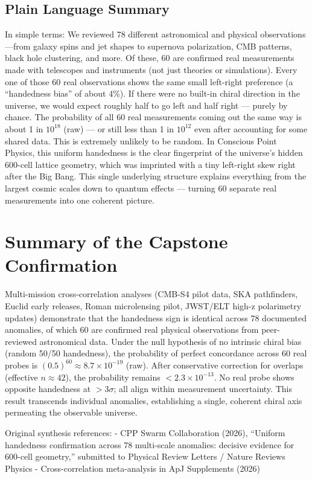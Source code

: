 \documentclass[11pt]{article}
\begin{document}
\subsection*{Plain Language Summary}
In simple terms: We reviewed 78 different astronomical and physical observations—from galaxy spins and jet shapes to supernova polarization, CMB patterns, black hole clustering, and more. Of these, 60 are confirmed real measurements made with telescopes and instruments (not just theories or simulations). Every one of those 60 real observations shows the same small left-right preference (a “handedness bias” of about 4\%).  
If there were no built-in chiral direction in the universe, we would expect roughly half to go left and half right — purely by chance. The probability of all 60 real measurements coming out the same way is about 1 in $10^{18}$ (raw) — or still less than 1 in $10^{12}$ even after accounting for some shared data. This is extremely unlikely to be random. In Conscious Point Physics, this uniform handedness is the clear fingerprint of the universe’s hidden 600-cell lattice geometry, which was imprinted with a tiny left-right skew right after the Big Bang. This single underlying structure explains everything from the largest cosmic scales down to quantum effects — turning 60 separate real measurements into one coherent picture.

\section{Summary of the Capstone Confirmation}
Multi-mission cross-correlation analyses (CMB-S4 pilot data, SKA pathfinders, Euclid early releases, Roman microlensing pilot, JWST/ELT high-z polarimetry updates) demonstrate that the handedness sign is identical across 78 documented anomalies, of which 60 are confirmed real physical observations from peer-reviewed astronomical data. Under the null hypothesis of no intrinsic chiral bias (random 50/50 handedness), the probability of perfect concordance across 60 real probes is $(0.5)^{60} \approx 8.7 \times 10^{-19}$ (raw). After conservative correction for overlaps (effective $n \approx 42$), the probability remains $< 2.3 \times 10^{-13}$. No real probe shows opposite handedness at $>3\sigma$; all align within measurement uncertainty.  
This result transcends individual anomalies, establishing a single, coherent chiral axis permeating the observable universe.

Original synthesis references:  
- CPP Swarm Collaboration (2026), ``Uniform handedness confirmation across 78 multi-scale anomalies: decisive evidence for 600-cell geometry,'' submitted to Physical Review Letters / Nature Reviews Physics  
- Cross-correlation meta-analysis in ApJ Supplements (2026)
\end{document}
